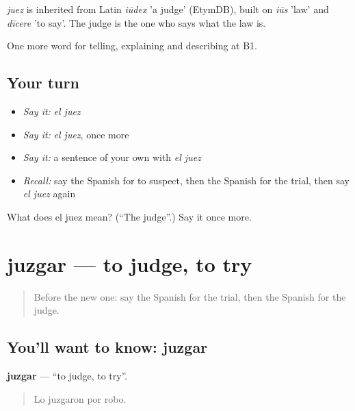 \begin{cousinweb}
\emph{juez} is inherited from Latin \emph{iūdex} 'a judge' (EtymDB), built on \emph{iūs} 'law' and \emph{dīcere} 'to say'. The judge is the one who says what the law is.
\end{cousinweb}

\begin{grammarlens}[title={What you've built}]
One more word for telling, explaining and describing at B1.
\end{grammarlens}

\subsection*{Your turn}
\begin{itemize}
\raggedright
  \item \emph{Say it:} \emph{el juez}
  \item \emph{Say it:} \emph{el juez}, once more
  \item \emph{Say it:} a sentence of your own with \emph{el juez}
  \item \emph{Recall:} say the Spanish for to suspect, then the Spanish for the trial, then say \emph{el juez} again
\end{itemize}

\begin{tcolorbox}[breakable,colback=teal!4,colframe=teal!35!black,title={Before you move on}]
What does el juez mean? (\textquotedblleft{}The judge\textquotedblright{}.) Say it once more.
\end{tcolorbox}
\section[juzgar]{juzgar — to judge, to try}

\label{lesson:ES-C522-juzgar}



\begin{quote}
Before the new one: say the Spanish for the trial, then the Spanish for the judge.
\end{quote}

\subsection*{You'll want to know: juzgar}
\textbf{juzgar} — \textquotedblleft{}to judge, to try\textquotedblright{}.

\begin{quote}
Lo juzgaron por robo.
\end{quote}

